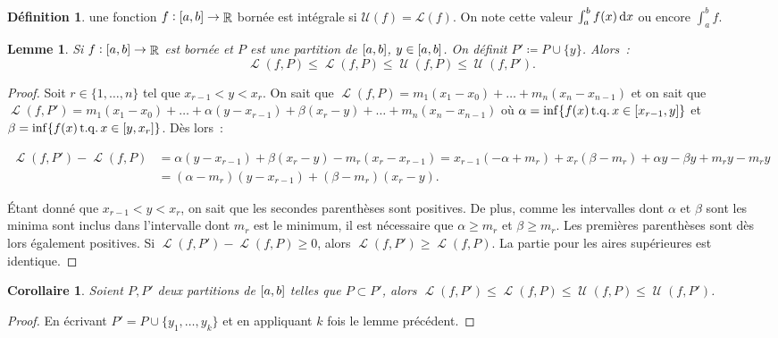 \documentclass{article}
\DeclareMathOperator{\R}{\mathbb R}
\DeclareMathOperator{\tq}{ t.q. }
\DeclareMathOperator{\Larea}{\mathcal L}
\DeclareMathOperator{\Uarea}{\mathcal U}
\newcommand{\ab}{\interval ab}
\newcommand{\fabr}[1]{#1 : \ab \to \R}
\newtheorem{cor}[thm]{Corollaire}
\newtheorem{lem}[thm]{Lemme}
\theoremstyle{definition}
\newtheorem{déf}[thm]{Définition}
\theoremstyle{remark}
\begin{document}
		\begin{déf} une fonction $\fabr f$ bornée est intégrale si $\mathcal U(f) = \mathcal L(f)$. On note cette valeur $\int_a^bf(x)\dif x$ ou encore
		$\int_a^b f$. \end{déf}

		\begin{lem} Si $\fabr f$ est bornée et $P$ est une partition de $\ab$, $y \in \ab$. On définit $P' \coloneqq P \cup \{y\}$. Alors~:
		\[\Larea(f, P) \leq \Larea(f, P) \leq \Uarea(f, P) \leq \Uarea(f, P').\]
		\end{lem}

		\begin{proof} Soit $r \in \{1, \ldots, n\}$ tel que $x_{r-1} < y < x_r$. On sait que $\Larea(f, P) = m_1(x_1-x_0) + \ldots + m_n(x_n-x_{n-1})$ et on
		sait que $\Larea(f, P') = m_1(x_1-x_0) + \ldots + \alpha(y-x_{r-1}) + \beta(x_r-y) + \ldots + m_n(x_n-x_{n-1})$ où
		$\alpha = \inf \{f(x) \tq x \in \interval {x_{r-1}}y\}$ et $\beta = \inf \{f(x) \tq x \in \interval y{x_r}\}$. Dès lors~:

		\begin{align*}
			\Larea(f, P')-\Larea(f, P) &= \alpha(y-x_{r-1}) + \beta(x_r-y) - m_r(x_r-x_{r-1}) = x_{r-1}(-\alpha+m_r)+ x_r(\beta-m_r) + \alpha y - \beta y + m_ry - m_ry \\
			                           &= (\alpha-m_r)(y-x_{r-1}) + (\beta-m_r)(x_r-y).
		\end{align*}

		Étant donné que $x_{r-1} < y < x_r$, on sait que les secondes parenthèses sont positives. De plus, comme les intervalles dont $\alpha$ et $\beta$ sont
		les minima sont inclus dans l'intervalle dont $m_r$ est le minimum, il est nécessaire que $\alpha \geq m_r$ et $\beta \geq m_r$. Les premières
		parenthèses sont dès lors également positives. Si $\Larea(f, P')-\Larea(f, P) \geq 0$, alors $\Larea(f, P') \geq \Larea(f, P)$. La partie pour les aires
		supérieures est identique. \end{proof}

		\begin{cor} Soient $P, P'$ deux partitions de $\ab$ telles que $P \subset P'$, alors $\Larea(f, P') \leq \Larea(f, P) \leq \Uarea(f, P) \leq \Uarea(f, P')$.
		\end{cor}

		\begin{proof} En écrivant $P' = P \cup \{y_1, \ldots, y_k\}$ et en appliquant $k$ fois le lemme précédent. \end{proof}
\end{document}
